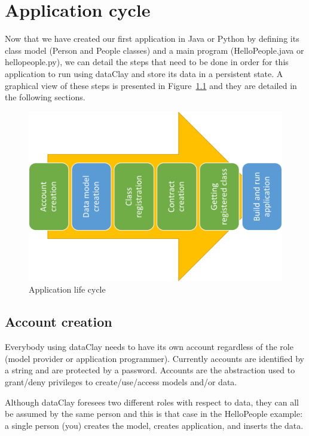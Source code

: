 
\chapter{Application cycle}

Now that we have created our first application in Java or Python by defining its class model (Person and People classes) and a main program (HelloPeople.java or hellopeople.py), we can detail the steps that need to be done in order for this application to run using dataClay and store its data in a persistent state. A graphical view of these steps is presented in Figure~\ref{fig:AppCycle} and they are detailed in the following sections.

\begin{figure}[h]
\centering\includegraphics[scale=0.5]{FirstSteps/AppCycle.png}
\caption{Application life cycle}
\label{fig:AppCycle}
\end{figure}

\section{Account creation}

Everybody using dataClay needs to have its own account regardless of the role (model provider or application programmer). Currently accounts are identified by a string and are protected by a password. Accounts are the abstraction used to grant/deny privileges to create/use/access models and/or data.

Although dataClay foresees two different roles with respect to data, they can all be assumed by the same person and this is that case in the HelloPeople example: a single person (you) creates the model, creates application, and inserts the data.

